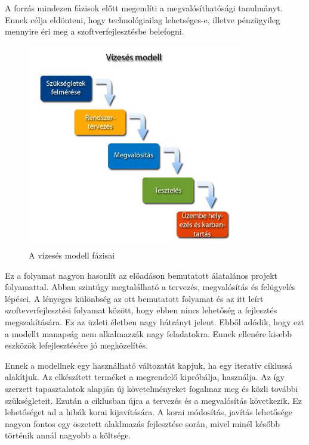 \documentclass[a4paper,12pt,leqno, notitlepage]{article}%
\begin{document}
A \cite{waterfall} forrás mindezen fázisok előtt megemlíti a megvalósíthatósági tanulmányt. Ennek célja eldönteni, hogy technológiailag lehetséges-e, illetve pénzügyileg mennyire éri meg a szoftverfejlesztésbe belefogni.

\begin{figure}[htb]
	\centering
		\includegraphics[width=0.85\textwidth]{images/waterfall.jpg}
	\caption{A vízesés modell fázisai \cite{waterfall_image}}
	\label{fig:waterfall}
\end{figure}

Ez a folyamat nagyon hasonlít az előadáson bemutatott álatalános projekt folyamattal. Abban szintúgy megtalálható a tervezés, megvalósítás és felügyelés lépései. A lényeges különbség az ott bemutatott folyamat és az itt leírt szofteverfejlesztési folyamat között, hogy ebben nincs lehetőség a fejlesztés megszakítására. Ez az üzleti életben nagy hátrányt jelent. Ebből adódik, hogy ezt a modellt manapság nem alkalmazzák nagy feladatokra. Ennek ellenére kisebb eszközök lefejlesztésére jó megközelítés.

Ennek a modellnek egy használható változatát kapjuk, ha egy iteratív ciklussá alakítjuk. Az elkészített terméket a megrendelő kipróbálja, használja. Az így szerzett tapasztalatok alapján új követelményeket fogalmaz meg és közli további szükségleteit. Ezután a ciklusban újra  a tervezés és a megvalósítás következik. Ez lehetőséget ad a hibák korai kijavítására. A korai módosítás, javítás lehetősége nagyon fontos egy öszetett alaklmazás fejlesztése során, mivel minél később történik annál nagyobb a költsége. \cite{fix_cost}
\end{document}
